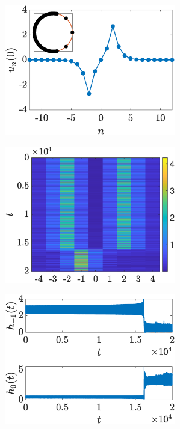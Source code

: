 \documentclass[12pt,reqno]{amsart}
\theoremstyle{definition}
\begin{document}
\begin{figure}
	\begin{center}
	\begin{subfigure}{0.45\linewidth}
		\caption{}
		\includegraphics[width=7.5cm]{timestepN4longspec.eps}
		\label{fig:timestepSGpmlonga}
	\end{subfigure}
	\begin{subfigure}{0.45\linewidth}
		\caption{}
		\includegraphics[width=7.5cm]{N4pmcolormap.eps}
		\label{fig:timestepSGpmlongb}
	\end{subfigure}
	\begin{subfigure}{0.45\linewidth}
		\caption{}
		\includegraphics[width=7.5cm]{N4pmh1.eps}
		\label{fig:timestepSGpmlongc}
	\end{subfigure}
	\begin{subfigure}{0.45\linewidth}
		\caption{}

\end{subfigure}
\end{center}
\end{figure}
\end{document}
